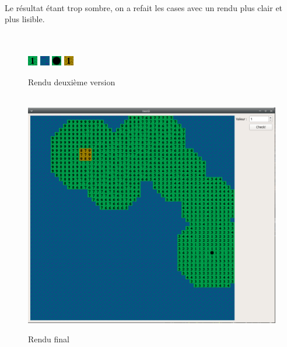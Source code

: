 \documentclass{article}
\begin{document}
~\\~\\~\\
Le résultat étant trop sombre, on a refait les cases avec un rendu plus clair et plus lisible.\\~\\~\\
\begin{figure}[!h]
\centering
\includegraphics[scale=2]{Images/green.jpg}
\includegraphics[scale=2]{Images/water.jpg}
\includegraphics[scale=2]{Images/hole.jpg}
\includegraphics[scale=2]{Images/start.jpg}
\caption{Rendu deuxième version}
~\\
\includegraphics[scale=0.5]{Images/terrain2.jpg}
\caption{Rendu final}
\end{figure}
~\\
\newpage
\end{document}
